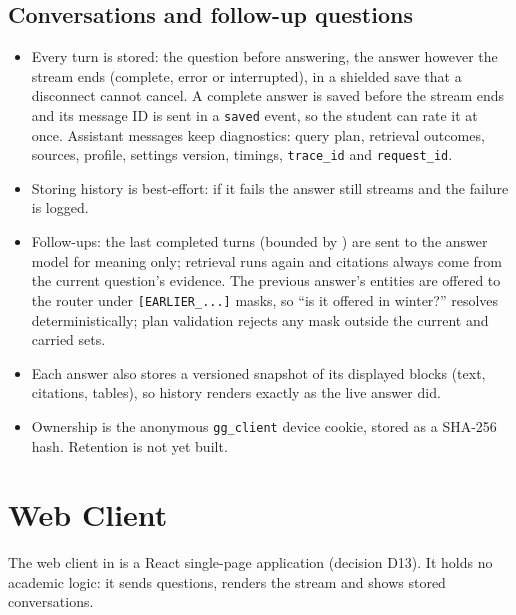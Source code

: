 \documentclass[11pt,letterpaper]{report}
\begin{document}
\section{Conversations and follow-up questions}
\begin{itemize}
  \item Every turn is stored: the question before answering, the answer however the stream ends
        (complete, error or interrupted), in a shielded save that a disconnect cannot cancel. A
        complete answer is saved before the stream ends and its message ID is sent in a
        \texttt{saved} event, so the student can rate it at once.
        Assistant messages keep diagnostics: query plan, retrieval outcomes, sources, profile,
        settings version, timings, \texttt{trace\_id} and \texttt{request\_id}.
  \item Storing history is best-effort: if it fails the answer still streams and the failure is logged.
  \item Follow-ups: the last completed turns (bounded by ) are sent
        to the answer model for meaning only; retrieval runs again and citations always come from the
        current question's evidence. The previous answer's entities are offered to the router under
        \texttt{[EARLIER\_...]} masks, so ``is it offered in winter?'' resolves deterministically; plan
        validation rejects any mask outside the current and carried sets.
  \item Each answer also stores a versioned snapshot of its displayed blocks (text, citations, tables),
        so history renders exactly as the live answer did.
  \item Ownership is the anonymous \texttt{gg\_client} device cookie, stored as a SHA-256 hash.
        Retention is not yet built.
\end{itemize}

\chapter{Web Client}\label{ch:client}
The web client in  is a React single-page application (decision D13). It holds no
academic logic: it sends questions, renders the stream and shows stored conversations.
\end{document}
